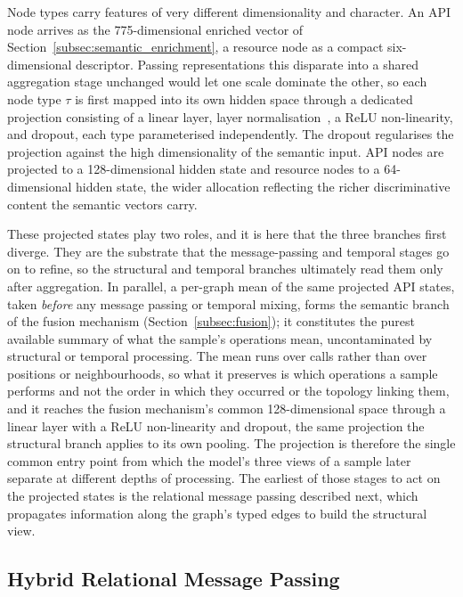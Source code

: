 \documentclass[%
    BCOR=10mm,
    DIV=13,
    toc=bibliography,
    toc=listof,
    oneside,
    12pt,
]{scrbook}
\begin{document}
Node types carry features of very different dimensionality and character. An API
node arrives as the 775-dimensional enriched vector of
Section~\ref{subsec:semantic_enrichment}, a resource node as a compact
six-dimensional descriptor. Passing representations this disparate into a shared aggregation
stage unchanged would let one scale dominate the other, so each node type $\tau$
is first mapped into its own hidden space through a dedicated projection
consisting of a linear layer, layer normalisation~\cite{ba2016layernorm}, a ReLU
non-linearity, and dropout, each type parameterised independently. The dropout regularises the projection against the
high dimensionality of the semantic input. API nodes are projected to a 128-dimensional hidden state and
resource nodes to a 64-dimensional hidden state, the wider allocation reflecting
the richer discriminative content the semantic vectors carry.

These projected states play two roles, and it is here that the three branches
first diverge. They are the substrate that the message-passing and temporal
stages go on to refine, so the structural and temporal branches ultimately read
them only after aggregation. In parallel, a per-graph mean of the same
projected API states, taken \emph{before} any message passing or temporal
mixing, forms the semantic branch of the fusion mechanism
(Section~\ref{subsec:fusion}); it constitutes the purest available summary of
what the sample's operations mean, uncontaminated by structural or temporal
processing. The mean runs over calls rather than over positions or
neighbourhoods, so what it preserves is which operations a sample performs and
not the order in which they occurred or the topology linking them, and it
reaches the fusion mechanism's common 128-dimensional space through a linear
layer with a ReLU non-linearity and dropout, the same projection the structural
branch applies to its own pooling. The projection is therefore the single common entry point from which
the model's three views of a sample later separate at different depths of
processing. The earliest of those stages to act on the projected states is the
relational message passing described next, which propagates information along the
graph's typed edges to build the structural view.

\subsection{Hybrid Relational Message Passing}
\label{subsec:hybrid_mp}
\end{document}
